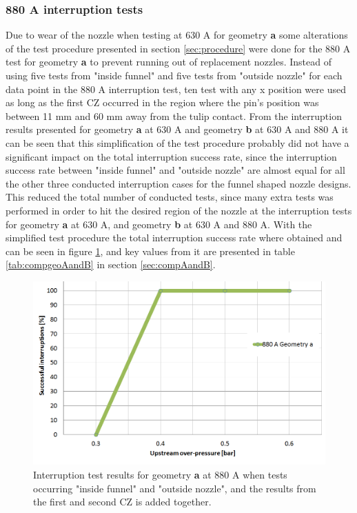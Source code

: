 \documentclass[10pt,b5paper,twoside]{article}
\begin{document}
\subsubsection*{880 A interruption tests}
Due to wear of the nozzle when testing at 630 A for geometry \textbf{a} some alterations of the test procedure presented in section \ref{sec:procedure} were done for the 880 A test for geometry \textbf{a} to prevent running out of replacement nozzles. Instead of using five tests from "inside funnel" and five tests from "outside nozzle" for each data point in the 880 A interruption test, ten test with any x position were used as long as the first CZ occurred in the region where the pin's position was between 11 mm and 60 mm away from the tulip contact. From the interruption results presented for geometry \textbf{a} at 630 A and geometry \textbf{b} at 630 A and 880 A it can be seen that this simplification of the test procedure probably did not have a significant impact on the total interruption success rate, since the interruption success rate between "inside funnel" and "outside nozzle" are almost equal for all the other three conducted interruption cases for the funnel shaped nozzle designs. This reduced the total number of conducted tests, since many extra tests was performed in order to hit the desired region of the nozzle at the interruption tests for geometry \textbf{a} at 630 A, and geometry \textbf{b} at 630 A and 880 A. With the simplified test procedure the total interruption success rate where obtained and can be seen in figure \ref{fig:results880AgeoA}, and key values from it are presented in table \ref{tab:compgeoAandB} in section \ref{sec:compAandB}.


\begin{figure}[H]
\centering
\includegraphics[scale=0.45]{Bilder/Results/geoA880Anew.PNG}
\caption{Interruption test results for geometry \textbf{a} at 880 A when tests occurring "inside funnel" and "outside nozzle", and the results from the first and second CZ is added together.} \label{fig:results880AgeoA}
\end{figure}
\end{document}
